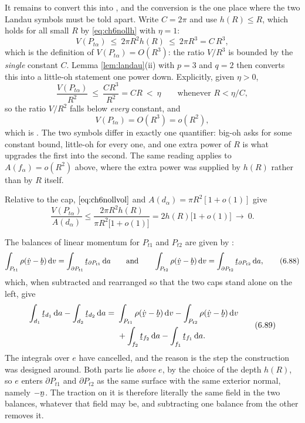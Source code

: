 It remains to convert this into , and the conversion is the
one place where the two Landau symbols must be told apart. Write
$C=2\pi$ and use $h(R)\le R$, which holds for all small $R$ by
\eqref{eq:ch6nollh} with $\eta=1$:
\[
   V(P_{t\alpha})\ \le\ 2\pi R^{2}h(R)\ \le\ 2\pi R^{3}
   =C\,R^{3},
\]
which is the definition of $V(P_{t\alpha})=O(R^{3})$: the ratio
$V/R^{3}$ is bounded by the \emph{single} constant $C$. Lemma
\ref{lem:landau}\textup{(ii)} with $p=3$ and $q=2$ then converts this
into a little-oh statement one power down. Explicitly, given $\eta>0$,
\[
   \frac{V(P_{t\alpha})}{R^{2}}\ \le\ \frac{C R^{3}}{R^{2}}=CR
   \ <\ \eta \qquad\text{whenever } R<\eta/C ,
\]
so the ratio $V/R^{2}$ falls below \emph{every} constant, and
\[
   V(P_{t\alpha})=O(R^{3})=o(R^{2}),
\]
which is . The two symbols differ in exactly one quantifier:
big-oh asks for some constant bound, little-oh for every one, and one
extra power of $R$ is what upgrades the first into the second. The same
reading applies to $A(f_{\alpha})=o(R^{2})$ above, where the extra power
was supplied by $h(R)$ rather than by $R$ itself.

Relative to the cap, $\eqref{eq:ch6nollvol}$ and $A(d_{\alpha})
=\pi R^{2}[1+o(1)]$ give
\[
   \frac{V(P_{t\alpha})}{A(d_{\alpha})}
   \le\frac{2\pi R^{2}h(R)}{\pi R^{2}\big[1+o(1)\big]}
   =2h(R)\big[1+o(1)\big]\ \longrightarrow\ 0 .
\]

The balances of linear momentum for $P_{t1}$ and $P_{t2}$ are given by
:
\begin{equation}
   \int_{P_{t1}}\rho(\dot\bv-\bb)\,\dl v
   =\int_{\partial P_{t1}}\bt_{\partial P_{t1}}\,\dl a
   \qquad\text{and}\qquad
   \int_{P_{t2}}\rho(\dot\bv-\bb)\,\dl v
   =\int_{\partial P_{t2}}\bt_{\partial P_{t2}}\,\dl a ,
   \tag{6.88}\label{eq:6.88}
\end{equation}
which, when subtracted and rearranged so that the two caps stand alone
on the left, give
\begin{equation}
\begin{aligned}
   \int_{d_{1}}\bt_{d_{1}}\,\dl a-\int_{d_{2}}\bt_{d_{2}}\,\dl a
   =\ &\int_{P_{t1}}\rho(\dot\bv-\bb)\,\dl v
       -\int_{P_{t2}}\rho(\dot\bv-\bb)\,\dl v\\
     &+\int_{f_{2}}\bt_{f_{2}}\,\dl a-\int_{f_{1}}\bt_{f_{1}}\,\dl a .
\end{aligned}
   \tag{6.89}\label{eq:6.89}
\end{equation}
The integrals over $e$ have cancelled, and the reason is the step the
construction was designed around.
Both parts lie \emph{above} $e$, by the choice of the depth $h(R)$, so
$e$ enters $\partial P_{t1}$ and $\partial P_{t2}$ as the same surface
with the same exterior normal, namely $-\bn$. The traction on it is
therefore literally the same field in the two balances, whatever that
field may be, and subtracting one balance from the other removes it.

